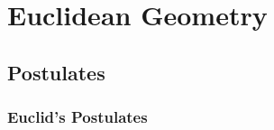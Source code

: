 \documentclass[12pt, a4paper, oneside, openright, titlepage]{book}
\begin{document}
\tableofcontents

\part{Euclidean Geometry}

\chapter{Postulates}

\section{Euclid's Postulates}
\end{document}
